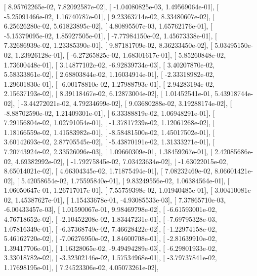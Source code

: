 \documentclass{article}
\begin{document}
       [  8.95762265e-02,   7.82092587e-02],
       [ -1.04080825e-03,   1.49569064e-01],
       [ -5.25091466e-02,   1.16740787e-01],
       [  9.23363714e-02,   8.33480607e-02],
       [  6.25626280e-02,   5.61823895e-02],
       [  4.80895507e-03,   1.65762176e-01],
       [ -5.15379095e-02,   1.85927505e-01],
       [ -7.77984150e-02,   1.45673338e-01],
       [  7.32686939e-02,   1.23385390e-01],
       [  9.87181709e-02,   8.36233450e-02],
       [  5.03495150e-02,   1.23926128e-01],
       [ -6.27265825e-02,   1.68301617e-01],
       [  5.85260848e-02,   1.73600448e-01],
       [  3.14877102e-02,  -6.92839734e-03],
       [  3.40207870e-02,   5.58333861e-02],
       [  2.68803844e-02,   1.16034914e-01],
       [ -2.33318982e-02,   1.29601830e-01],
       [ -6.00178810e-02,   1.27988793e-01],
       [  2.94283194e-02,   2.15637193e-02],
       [  8.39118467e-02,   6.12873004e-02],
       [  1.01452541e-01,   5.43918744e-02],
       [ -3.44272021e-02,   4.79234699e-02],
       [  9.03680288e-02,   3.19288174e-02],
       [ -8.88702590e-02,   1.21409301e-01],
       [  6.33388819e-02,   1.06948291e-01],
       [  7.29156804e-02,   1.02791054e-01],
       [ -1.37817239e-02,   1.12061268e-02],
       [  1.18166559e-02,   1.41583982e-01],
       [ -8.58481500e-02,   1.45017502e-01],
       [  3.60142693e-02,   2.87705545e-02],
       [ -5.43870191e-02,   1.31333271e-01],
       [  7.20743924e-02,   2.33526096e-03],
       [  1.09660309e-01,   1.38459267e-01],
       [  2.42085686e-02,   4.69382992e-02],
       [ -1.79275845e-02,   7.03423634e-02],
       [ -1.63022015e-02,   8.65014021e-02],
       [  4.66304345e-02,   1.71875494e-01],
       [  7.08232469e-02,   8.06601421e-02],
       [  5.42058654e-02,   1.75595840e-01],
       [  9.83249556e-02,   1.06384564e-01],
       [  1.06050647e-01,   1.26717017e-01],
       [  7.55759398e-02,   1.01940485e-01],
       [  3.00410081e-02,   1.45387627e-01],
       [  1.15433678e-01,  -4.93085533e-03],
       [  7.37865710e-03,  -6.00433457e-03],
       [  1.01590067e-01,   9.98469798e-02],
       [ -6.61593001e-02,   4.76718652e-02],
       [ -2.10452208e-02,   1.83447231e-01],
       [ -7.69795328e-03,   1.07816349e-01],
       [ -6.37368749e-02,   7.46628422e-02],
       [ -1.22974158e-02,   5.46162720e-02],
       [ -7.06276950e-02,   1.84600708e-01],
       [ -2.81639910e-02,   1.39417706e-01],
       [  1.16328065e-02,  -9.49494289e-03],
       [ -6.29801933e-02,   3.33018782e-02],
       [ -3.32302146e-02,   1.57534968e-01],
       [ -3.79737841e-02,   1.17698195e-01],
       [  7.24523306e-02,   4.05073261e-02],
\end{document}
